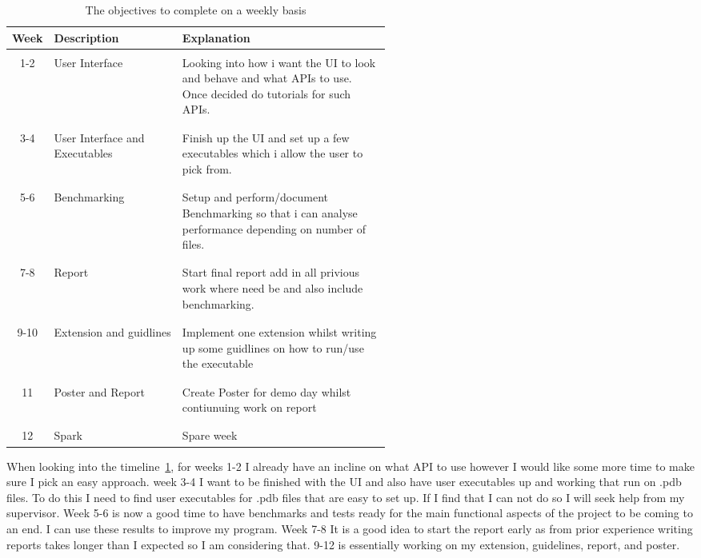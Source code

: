 \documentclass{report}
\begin{document}
\begin{table}[h!]
    \begin{center}
    \label{tab:Timeline}
        \begin{tabular}{c|l|p{0.55\linewidth}}
        Week & Description & Explanation\\
        \hline
        \\
        1-2 & User Interface & Looking into how i want the UI to look and behave and what APIs to use. Once decided do tutorials for such APIs.\\
        \\
        \hline
        \\
        3-4 & User Interface and Executables & Finish up the UI and set up a few executables which i allow the user to pick from.\\
        \\
        \hline
        \\
        5-6 & Benchmarking & Setup and perform/document Benchmarking so that i can analyse performance depending on number of files.\\
        \\
        \hline
        \\
        7-8 & Report & Start final report add in all privious work where need be and also include benchmarking.\\
        \\
        \hline
        \\
        9-10 & Extension and guidlines & Implement one extension whilst writing up some guidlines on how to run/use the executable\\
        \\
        \hline
        \\
        11 & Poster and Report & Create Poster for demo day whilst contiunuing work on report\\
        \\
        \hline
        \\
        12 & Spark & Spare week\\
        \end{tabular}
        \caption{\label{Timeline}The objectives to complete on a weekly basis}
    \end{center}
\end{table}

When looking into the timeline~\ref{Timeline}, for weeks 1-2 I already have an incline on what API to use however I would like some more time to make sure I pick an easy approach. week 3-4 I want to be finished with the UI and also have user executables up and working that run on .pdb files. To do this I need to find user executables for .pdb files that are easy to set up. If I find that I can not do so I will seek help from my supervisor. Week 5-6 is now a good time to have benchmarks and tests ready for the main functional aspects of the project to be coming to an end. I can use these results to improve my program. Week 7-8 It is a good idea to start the report early as from prior experience writing reports takes longer than I expected so I am considering that. 9-12 is essentially working on my extension, guidelines, report, and poster.
\end{document}
